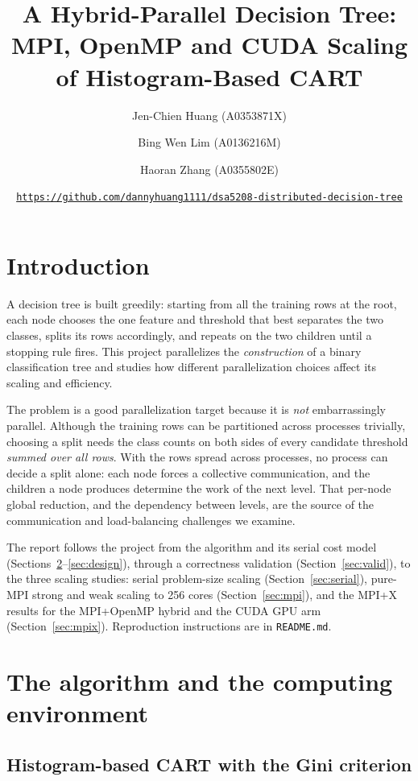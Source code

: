 \documentclass[11pt]{article}
\title{A Hybrid-Parallel Decision Tree:\\ MPI, OpenMP and CUDA Scaling of Histogram-Based CART}
\author{Jen-Chien Huang (A0353871X) \and Bing Wen Lim (A0136216M) \and Haoran Zhang (A0355802E)}
\date{\href{https://github.com/dannyhuang1111/dsa5208-distributed-decision-tree}{\texttt{https://github.com/dannyhuang1111/dsa5208-distributed-decision-tree}}}
\begin{document}
\maketitle

\section{Introduction}

A decision tree is built greedily: starting from all the training rows at the root, each node chooses the one feature and threshold that best separates the two classes, splits its rows accordingly, and repeats on the two children until a stopping rule fires. This project parallelizes the \emph{construction} of a binary classification tree and studies how different parallelization choices affect its scaling and efficiency.

The problem is a good parallelization target because it is \emph{not} embarrassingly parallel. Although the training rows can be partitioned across processes trivially, choosing a split needs the class counts on both sides of every candidate threshold \emph{summed over all rows}. With the rows spread across processes, no process can decide a split alone: each node forces a collective communication, and the children a node produces determine the work of the next level. That per-node global reduction, and the dependency between levels, are the source of the communication and load-balancing challenges we examine.

The report follows the project from the algorithm and its serial cost model (Sections~\ref{sec:algo}--\ref{sec:design}), through a correctness validation (Section~\ref{sec:valid}), to the three scaling studies: serial problem-size scaling (Section~\ref{sec:serial}), pure-MPI strong and weak scaling to \num{256} cores (Section~\ref{sec:mpi}), and the MPI+X results for the MPI+OpenMP hybrid and the CUDA GPU arm (Section~\ref{sec:mpix}). Reproduction instructions are in \texttt{README.md}.

\section{The algorithm and the computing environment}\label{sec:algo}

\subsection{Histogram-based CART with the Gini criterion}
\end{document}
